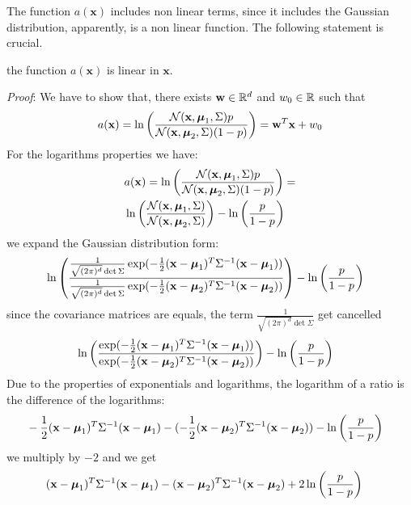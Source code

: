 \documentclass[10pt, letterpaper]{report}
\begin{document}
The function $a(\mathbf x)$ includes non linear terms, since it includes the Gaussian distribution, apparently, is a non linear function. The following statement is crucial.
\begin{theorem}
    the function $a(\mathbf x)$ is linear in $\mathbf x$.
\end{theorem}
\textit{Proof}: We have to show that, there exists $\mathbf w\in {\mathbb R}^d$ and $w_0\in {\mathbb R}$ such that\begin{equation}
a(\mathbf x)=
\ln\left(\frac{\mathcal N(\mathbf x,{\boldsymbol{\mu}}_1,\Sigma)p}{\mathcal N(\mathbf x,{\boldsymbol{\mu}}_2,\Sigma)(1-p)}\right)=\mathbf w^T\mathbf x+w_0
\end{equation}
For the logarithms properties we have:\begin{align}
    &a(\mathbf x)=
\ln\left(\frac{\mathcal N(\mathbf x,{\boldsymbol{\mu}}_1,\Sigma)p}{\mathcal N(\mathbf x,{\boldsymbol{\mu}}_2,\Sigma)(1-p)}\right)=\\
&\ln\left(\frac{\mathcal N(\mathbf x,{\boldsymbol{\mu}}_1,\Sigma)}{\mathcal N(\mathbf x,{\boldsymbol{\mu}}_2,\Sigma)}\right)-\ln\left(\frac{p}{1-p}\right)
\end{align}
we expand the Gaussian distribution form:\begin{align}
    &\ln\left(\frac{ \frac{1}{\sqrt{(2\pi)^d}\det\Sigma}\exp(-\frac{1}{2}(\mathbf x-{\boldsymbol{\mu}}_1)^T\Sigma^{-1}(\mathbf x-{\boldsymbol{\mu}}_1))}{
        \frac{1}{\sqrt{(2\pi)^d}\det\Sigma}\exp(-\frac{1}{2}(\mathbf x-{\boldsymbol{\mu}}_2)^T\Sigma^{-1}(\mathbf x-{\boldsymbol{\mu}}_2))
    }\right)-\ln\left(\frac{p}{1-p}\right)
\end{align}
since the covariance matrices are equals, the term $\frac{1}{\sqrt{(2\pi)^d}\det\Sigma}$ get cancelled\begin{align}
    &\ln\left(\frac{\exp(-\frac{1}{2}(\mathbf x-{\boldsymbol{\mu}}_1)^T\Sigma^{-1}(\mathbf x-{\boldsymbol{\mu}}_1))}{
        \exp(-\frac{1}{2}(\mathbf x-{\boldsymbol{\mu}}_2)^T\Sigma^{-1}(\mathbf x-{\boldsymbol{\mu}}_2))
    }\right)-\ln\left(\frac{p}{1-p}\right)
\end{align}
Due to the properties of exponentials and logarithms, the logarithm of a ratio is the difference of the logarithms:\begin{align}
    &-\frac{1}{2}(\mathbf x-{\boldsymbol{\mu}}_1)^T\Sigma^{-1}(\mathbf x-{\boldsymbol{\mu}}_1)-
    (-\frac{1}{2}(\mathbf x-{\boldsymbol{\mu}}_2)^T\Sigma^{-1}(\mathbf x-{\boldsymbol{\mu}}_2))
    -
    \ln\left(\frac{p}{1-p}\right)
\end{align}
we multiply by $-2$ and we get\begin{align}
    &(\mathbf x-{\boldsymbol{\mu}}_1)^T\Sigma^{-1}(\mathbf x-{\boldsymbol{\mu}}_1)-
    (\mathbf x-{\boldsymbol{\mu}}_2)^T\Sigma^{-1}(\mathbf x-{\boldsymbol{\mu}}_2)
    +
    2\ln\left(\frac{p}{1-p}\right)
\end{align}
\end{document}
